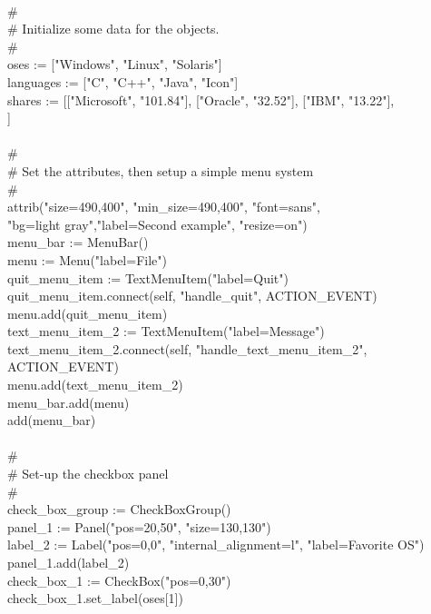 {\ \\
\>\>\# \\
\>\>\# Initialize some data for the objects. \\
\>\>\# \\
\>\>oses := ["Windows", "Linux", "Solaris"] \\
\>\>languages := ["C", "C++", "Java", "Icon"] \\
\>\>shares := [["Microsoft", "101.84"], ["Oracle", "32.52"], ["IBM", "13.22"], \\
\>\>\>["Intel", "142.00"]] \\
\ \\
\>\>\# \\
\>\>\# Set the attributes, then setup a simple menu system \\
\>\>\# \\
\>\>attrib("size=490,400", "min\_size=490,400", "font=sans", \\
\>\>\>"bg=light gray","label=Second example", "resize=on") \\
\>\>menu\_bar := MenuBar() \\
\>\>menu := Menu("label=File") \\
\>\>quit\_menu\_item := TextMenuItem("label=Quit") \\
\>\>quit\_menu\_item.connect(self, "handle\_quit", ACTION\_EVENT) \\
\>\>menu.add(quit\_menu\_item) \\
\>\>text\_menu\_item\_2 := TextMenuItem("label=Message") \\
\>\>text\_menu\_item\_2.connect(self, "handle\_text\_menu\_item\_2", ACTION\_EVENT) \\
\>\>menu.add(text\_menu\_item\_2) \\
\>\>menu\_bar.add(menu) \\
\>\>add(menu\_bar) \\
\ \\
\>\>\# \\
\>\>\# Set-up the checkbox panel \\
\>\>\# \\
\>\>check\_box\_group := CheckBoxGroup() \\
\>\>panel\_1 := Panel("pos=20,50", "size=130,130") \\
\>\>label\_2 := Label("pos=0,0", "internal\_alignment=l", "label=Favorite OS") \\
\>\>panel\_1.add(label\_2) \\
\>\>check\_box\_1 := CheckBox("pos=0,30") \\
\>\>check\_box\_1.set\_label(oses[1]) \\
}
